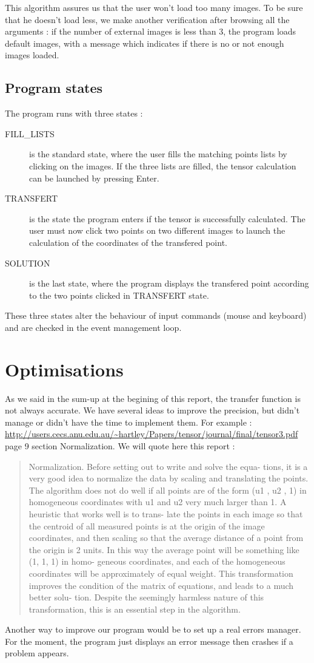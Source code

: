 \documentclass[a4paper,10pt]{report}
\begin{document}
This algorithm assures us that the user won't load too many images.
To be sure that he doesn't load less, we make another verification after browsing all the arguments :
if the number of external images is less than 3, the program loads default images, with a message
which indicates if there is no or not enough images loaded.

\subsection{Program states}
The program runs with three states :
\begin{description}
 \item[FILL\_LISTS] is the standard state, where the user fills the matching points lists by clicking on the images.
 If the three lists are filled, the tensor calculation can be launched by pressing Enter.
 \item[TRANSFERT] is the state the program enters if the tensor is successfully calculated. The user must now
 click two points on two different images to launch the calculation of the coordinates of the
 transfered point.
 \item[SOLUTION] is the last state, where the program displays the transfered point according to the two points clicked 
 in TRANSFERT state.
\end{description}

These three states alter the behaviour of input commands (mouse and keyboard) and are checked in the event management loop.


\section{Optimisations}

As we said in the sum-up at the begining of this report, the transfer function is not always accurate.
We have several ideas to improve the precision, but didn't manage or didn't have the time to implement them. For example : \url{http://users.cecs.anu.edu.au/~hartley/Papers/tensor/journal/final/tensor3.pdf} page 9 section Normalization.
We will quote here this report :
\begin{quotation}
  Normalization. Before setting out to write and solve the equa-
  tions, it is a very good idea to normalize the data by scaling and
  translating the points. The algorithm does not do well if all points
  are of the form (u1 , u2 , 1) in homogeneous coordinates with u1 and
  u2 very much larger than 1. A heuristic that works well is to trans-
  late the points in each image so that the centroid of all measured
  points is at the origin of the image coordinates, and then scaling so
  that the average distance of a point from the origin is 2 units. In
  this way the average point will be something like (1, 1, 1) in homo-
  geneous coordinates, and each of the homogeneous coordinates will
  be approximately of equal weight. This transformation improves the
  condition of the matrix of equations, and leads to a much better solu-
  tion. Despite the seemingly harmless nature of this transformation,
  this is an essential step in the algorithm.
\end{quotation}

Another way to improve our program would be to set up a real errors manager. For the moment, the program just
displays an error message then crashes if a problem appears.
\end{document}
